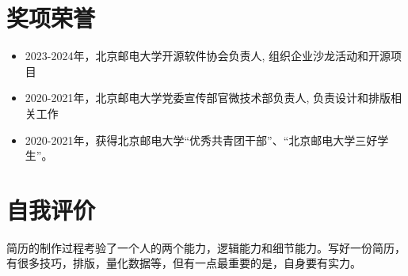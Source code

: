 \documentclass{resume}
\begin{document}
\section{奖项荣誉}
\begin{normalsize}
  \begin{itemize}[parsep=0.5ex]
    \item 2023-2024年，北京邮电大学开源软件协会负责人, 组织企业沙龙活动和开源项目  
    \item 2020-2021年，北京邮电大学党委宣传部官微技术部负责人, 负责设计和排版相关工作  
    \item 2020-2021年，获得北京邮电大学“优秀共青团干部”、“北京邮电大学三好学生”。
  \end{itemize}
\end{normalsize}

\section{自我评价}
\begin{itemize}
  \begin{normalsize}
      \item 简历的制作过程考验了一个人的两个能力，逻辑能力和细节能力。写好一份简历，有很多技巧，排版，量化数据等，但有一点最重要的是，自身要有实力。
  \end{normalsize}
\end{itemize}
\end{document}
